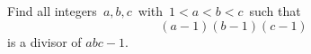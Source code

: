 Find all integers $\,a,b,c\,$ with $\,1<a<b<c\,$ such that \[ (a-1)(b-1)(c-1)  \] is a divisor of $abc-1.$